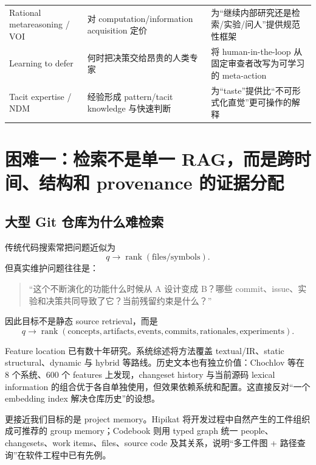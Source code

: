 \documentclass[11pt,a4paper]{ctexart}
\begin{document}
\begin{longtable}{p{}p{}p{}}
Rational metareasoning / VOI & 对 computation/information acquisition 定价 & 为“继续内部研究还是检索/实验/问人”提供规范性框架\parencite{russell1991metareasoning,hay2012selecting,saar2009activefeature,desabbata2024rational}\\
Learning to defer & 何时把决策交给昂贵的人类专家 & 将 human-in-the-loop 从固定审查者改写为可学习的 meta-action\parencite{hemmer2023defer}\\
Tacit expertise / NDM & 经验形成 pattern/tacit knowledge 与快速判断 & 为“taste”提供比“不可形式化直觉”更可操作的解释\parencite{patterson2010tacit,klein2015intuition,polanyi1958personal}\\
\bottomrule
\end{longtable}

\section{困难一：检索不是单一 RAG，而是跨时间、结构和 provenance 的证据分配}

\subsection{大型 Git 仓库为什么难检索}

传统代码搜索常把问题近似为
\begin{equation}
 q\longrightarrow \operatorname{rank}(\text{files/symbols}).
\end{equation}
但真实维护问题往往是：
\begin{quote}
“这个不断演化的功能什么时候从 A 设计变成 B？哪些 commit、issue、实验和决策共同导致了它？当前残留约束是什么？”
\end{quote}
因此目标不是静态 source retrieval，而是
\begin{equation}
 q\longrightarrow \operatorname{rank}(\text{concepts},\text{artifacts},\text{events},\text{commits},\text{rationales},\text{experiments}).
\end{equation}

Feature location 已有数十年研究。系统综述将方法覆盖 textual/IR、static structural、dynamic 与 hybrid 等路线\parencite{dit2013feature}。历史文本也有独立价值：Chochlov 等在 8 个系统、600 个 features 上发现，changeset history 与当前源码 lexical information 的组合优于各自单独使用，但效果依赖系统和配置\parencite{chochlov2017historical}。这直接反对“一个 embedding index 解决仓库历史”的设想。

更接近我们目标的是 project memory。Hipikat 将开发过程中自然产生的工件组织成可推荐的 group memory\parencite{cubranic2005hipikat}；Codebook 则用 typed graph 统一 people、changesets、work items、files、source code 及其关系，说明“多工件图 + 路径查询”在软件工程中已有先例\parencite{begel2010codebook}。
\end{document}

